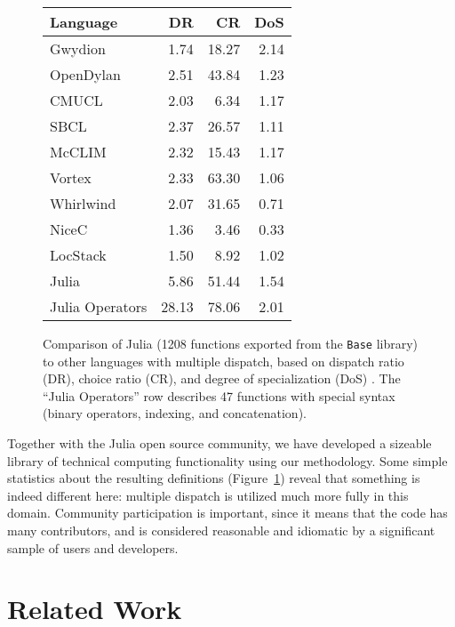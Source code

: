 \documentclass[12pt]{article}
\begin{document}
\begin{figure}
\begin{center}
\begin{tabular}{|l|r|r|r|}\hline
\textbf{Language} & \textbf{DR} & \textbf{CR} & \textbf{DoS} \\
\hline \hline
Gwydion    & 1.74 & 18.27 & 2.14 \\
\hline
OpenDylan  & 2.51 & 43.84 & 1.23 \\
\hline
CMUCL      & 2.03 &  6.34 & 1.17 \\
\hline
SBCL       & 2.37 & 26.57 & 1.11 \\
\hline
McCLIM     & 2.32 & 15.43 & 1.17 \\
\hline
Vortex     & 2.33 & 63.30 & 1.06 \\
\hline
Whirlwind  & 2.07 & 31.65 & 0.71 \\
\hline
NiceC      & 1.36 &  3.46 & 0.33 \\
\hline
LocStack   & 1.50 &  8.92 & 1.02 \\
\hline
Julia      & 5.86 & 51.44 & 1.54 \\
\hline
Julia Operators & 28.13 & 78.06 & 2.01 \\
\hline
\end{tabular}
\end{center}
\caption{
Comparison of Julia (1208 functions exported from the \texttt{Base} library)
to other languages with multiple dispatch, based on dispatch ratio (DR),
choice ratio (CR), and degree of specialization (DoS) \cite{multipledispatch}.
The ``Julia Operators'' row describes 47 functions with special syntax
(binary operators, indexing, and concatenation).
}
\label{dispatchratios}
\end{figure}

Together with the Julia open source community, we have developed a sizeable
library of technical computing functionality using our methodology. Some
simple statistics about the resulting definitions (Figure~\ref{dispatchratios})
reveal that something is indeed different here: multiple dispatch is
utilized much more fully in this domain. Community participation is
important, since it means that the code has many contributors, and
is considered reasonable and idiomatic by a significant sample of users
and developers.



\section{Related Work}
\end{document}

